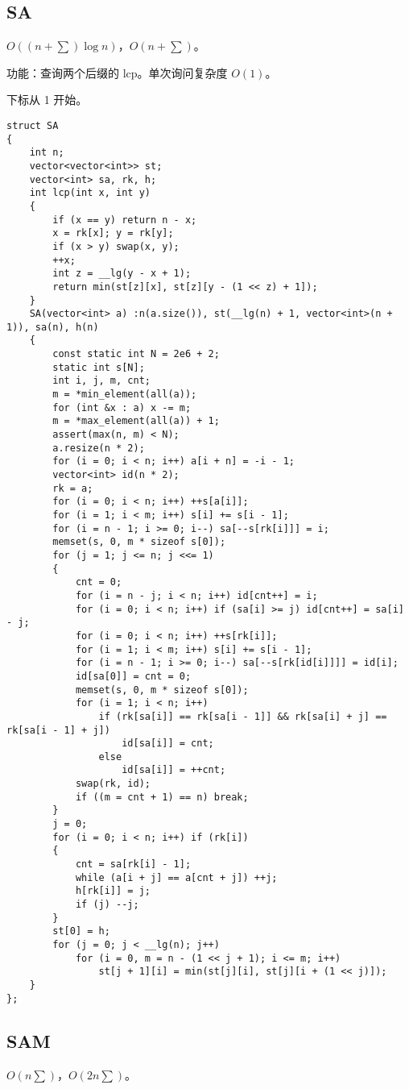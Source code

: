\documentclass[12pt]{ctexart}
\begin{document}
\subsection{SA}

$O((n+\sum)\log n)$，$O(n+\sum)$。

功能：查询两个后缀的 lcp。单次询问复杂度 $O(1)$。

下标从 1 开始。

\begin{lstlisting}
struct SA
{
	int n;
	vector<vector<int>> st;
	vector<int> sa, rk, h;
	int lcp(int x, int y)
	{
		if (x == y) return n - x;
		x = rk[x]; y = rk[y];
		if (x > y) swap(x, y);
		++x;
		int z = __lg(y - x + 1);
		return min(st[z][x], st[z][y - (1 << z) + 1]);
	}
	SA(vector<int> a) :n(a.size()), st(__lg(n) + 1, vector<int>(n + 1)), sa(n), h(n)
	{
		const static int N = 2e6 + 2;
		static int s[N];
		int i, j, m, cnt;
		m = *min_element(all(a));
		for (int &x : a) x -= m;
		m = *max_element(all(a)) + 1;
		assert(max(n, m) < N);
		a.resize(n * 2);
		for (i = 0; i < n; i++) a[i + n] = -i - 1;
		vector<int> id(n * 2);
		rk = a;
		for (i = 0; i < n; i++) ++s[a[i]];
		for (i = 1; i < m; i++) s[i] += s[i - 1];
		for (i = n - 1; i >= 0; i--) sa[--s[rk[i]]] = i;
		memset(s, 0, m * sizeof s[0]);
		for (j = 1; j <= n; j <<= 1)
		{
			cnt = 0;
			for (i = n - j; i < n; i++) id[cnt++] = i;
			for (i = 0; i < n; i++) if (sa[i] >= j) id[cnt++] = sa[i] - j;
			for (i = 0; i < n; i++) ++s[rk[i]];
			for (i = 1; i < m; i++) s[i] += s[i - 1];
			for (i = n - 1; i >= 0; i--) sa[--s[rk[id[i]]]] = id[i];
			id[sa[0]] = cnt = 0;
			memset(s, 0, m * sizeof s[0]);
			for (i = 1; i < n; i++)
				if (rk[sa[i]] == rk[sa[i - 1]] && rk[sa[i] + j] == rk[sa[i - 1] + j])
					id[sa[i]] = cnt;
				else
					id[sa[i]] = ++cnt;
			swap(rk, id);
			if ((m = cnt + 1) == n) break;
		}
		j = 0;
		for (i = 0; i < n; i++) if (rk[i])
		{
			cnt = sa[rk[i] - 1];
			while (a[i + j] == a[cnt + j]) ++j;
			h[rk[i]] = j;
			if (j) --j;
		}
		st[0] = h;
		for (j = 0; j < __lg(n); j++)
			for (i = 0, m = n - (1 << j + 1); i <= m; i++)
				st[j + 1][i] = min(st[j][i], st[j][i + (1 << j)]);
	}
};
\end{lstlisting}

\subsection{SAM}

$O(n\sum)$，$O(2n\sum )$。
\end{document}
